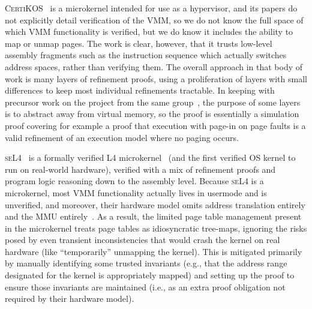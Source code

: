 \textsc{CertiKOS}~\cite{gu15,gu2016certikos,gu2018certikos,chen2016interrupts} is a microkernel intended for use as a hypervisor,
and its papers do not explicitly detail verification of the VMM, so we do not know the full space of which VMM functionality 
is verified, but we do know it includes the ability to map or unmap pages.
The work is clear, however, that it trusts low-level assembly fragments such as the instruction sequence which actually
switches address spaces, rather than verifying them.
The overall approach in that body of work is many layers of refinement proofs, using a
 proliferation of layers with small differences to keep most individual refinements tractable. In keeping with precursor work 
on the project from the same group~\cite{vaynberg2012compositional}, the purpose of some layers is to abstract away from 
virtual memory, so the proof is essentially a simulation proof covering for example a proof that execution with page-in on 
page faults is a valid refinement of an execution model where no paging occurs.

\textsc{seL4}~\cite{Klein2009seL4,seL4TOCS,Sewell2013translation} is a formally verified L4 microkernel~\cite{Liedtke1995,Liedtke1996} (and the first verified OS kernel to run on real-world hardware), verified with a mix of refinement proofs and program logic reasoning down to the assembly level.
Because \textsc{seL4} is a microkernel, most VMM functionality actually lives in usermode and is unverified, and moreover, their hardware model omits address translation entirely and the MMU entirely~\cite{Klein2009seL4,seL4TOCS}. As a result, the limited page table management present in the microkernel treats page tables as idiosyncratic tree-maps, ignoring the risks posed by even transient inconsistencies that would crash the kernel on real hardware (like ``temporarily'' unmapping the kernel). This is mitigated primarily by manually identifying some trusted invariants (e.g., that the address range designated for the kernel is appropriately mapped) and setting up the proof to ensure those invariants are maintained (i.e., as an extra proof obligation not required by their hardware model).


